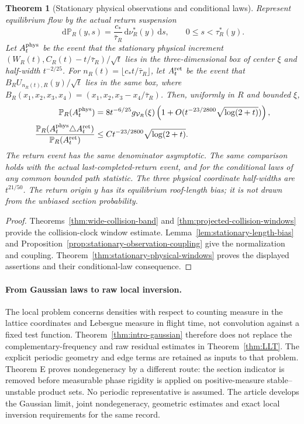 \documentclass[11pt,reqno]{amsart}
\numberwithin{equation}{section}
\newtheorem{maintheorem}{Theorem}
\theoremstyle{definition}\newtheorem{definition}[theorem]{Definition}
\theoremstyle{remark}\newtheorem{remark}[theorem]{Remark}
\newcommand{\dd}{\,\mathrm d}\newcommand{\one}{\mathbf1}
\begin{document}
\begin{maintheorem}[Stationary physical observations and conditional laws]
\label{thm:intro-stationary-physical-windows}
Represent equilibrium flow by the actual return suspension
\[
 \dd\mathbb P_R(y,s)=\frac{c_*}{\bar\tau_R}\dd\nu_R^*(y)\dd s,
 \qquad 0\le s<\tau_R^*(y).
\]
Let $A_t^{\rm phys}$ be the event that the stationary physical
increment $(W_R(t),C_R(t)-t/\bar\tau_R)/\sqrt t$ lies in the
three-dimensional box of center $\xi$ and half-width $t^{-2/25}$.
For $n_R(t)=\lfloor c_*t/\bar\tau_R\rfloor$, let $A_t^{\rm ret}$
be the event that $B_RU_{n_R(t),R}(y)/\sqrt t$ lies in the same box,
where $B_R(x_1,x_2,x_3,x_4)=(x_1,x_2,x_3-x_4/\bar\tau_R)$.
Then, uniformly in $R$ and bounded $\xi$,
\begin{align*}
 \mathbb P_R(A_t^{\rm phys})
 &=8t^{-6/25}g_{\mathcal V_R}(\xi)
       \left(1+O(t^{-23/2800}\sqrt{\log(2+t)})\right),\\
 \frac{\mathbb P_R(A_t^{\rm phys}\triangle A_t^{\rm ret})}
             {\mathbb P_R(A_t^{\rm ret})}
 &\le C t^{-23/2800}\sqrt{\log(2+t)}.
\end{align*}
The return event has the same denominator asymptotic. The same
comparison holds with the actual last-completed-return event, and
for the conditional laws of any common bounded path statistic.
The three physical coordinate half-widths are $t^{21/50}$.
The return origin $y$ has its equilibrium roof-length bias; it is
not drawn from the unbiased section probability.
\end{maintheorem}
\begin{proof}
Theorems~\ref{thm:wide-collision-band} and
\ref{thm:projected-collision-windows} provide the collision-clock
window estimate. Lemma~\ref{lem:stationary-length-bias} and
Proposition~\ref{prop:stationary-observation-coupling} give the
normalization and coupling. Theorem~\ref{thm:stationary-physical-windows}
proves the displayed assertions and their conditional-law consequence.
\end{proof}

\paragraph{From Gaussian laws to raw local inversion.}
The local problem concerns densities with respect to counting measure
in the lattice coordinates and Lebesgue measure in flight time, not
convolution against a fixed test function. Theorem~\ref{thm:intro-gaussian}
therefore does not replace the complementary-frequency and raw residual
estimates in Theorem~\ref{thm:LLT}. The explicit periodic geometry
and edge terms are retained as inputs to that problem. Theorem E proves
nondegeneracy by a different route: the section indicator is removed
before measurable phase rigidity is applied on positive-measure
stable--unstable product sets. No periodic representative is assumed.
The article develops the Gaussian limit, joint nondegeneracy, geometric
estimates and exact local inversion requirements for the same record.
\end{document}
